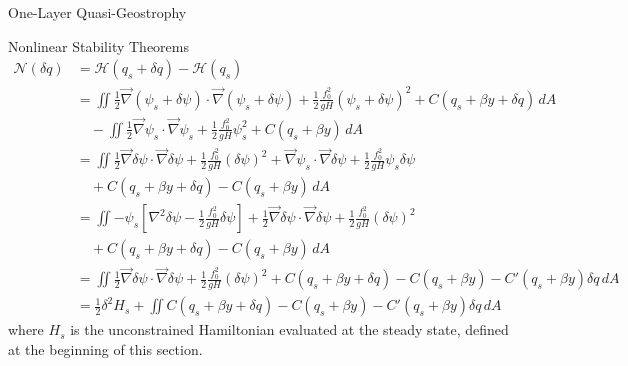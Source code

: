 \documentclass[12pt]{article}
\begin{document}
\begin{section}{One-Layer Quasi-Geostrophy}
\begin{subsection}{Nonlinear Stability Theorems}
        \begin{align*}
            \mathcal{N}(\delta q)
            &= \mathcal{H}(q_s + \delta q) - \mathcal{H}(q_s) \\
            &= \iint  \frac12 \vec\nabla(\psi_s + \delta \psi) \cdot \vec\nabla(\psi_s + \delta \psi) + \frac12 \frac{f_0^2}{g H} (\psi_s + \delta \psi)^2 + C(q_s + \beta y + \delta q) \, dA \\
            &\quad - \iint  \frac12 \vec\nabla\psi_s \cdot \vec\nabla\psi_s + \frac12 \frac{f_0^2}{g H} \psi_s^2 + C(q_s + \beta y) \, dA \\
            &= \iint \frac12 \vec\nabla\delta\psi \cdot \vec\nabla\delta\psi + \frac12 \frac{f_0^2}{g H} (\delta \psi)^2 + \vec\nabla\psi_s \cdot \vec\nabla\delta\psi + \frac12 \frac{f_0^2}{g H} \psi_s\delta\psi \\
            &\quad + C(q_s + \beta y + \delta q) - C(q_s + \beta y) \, dA \\
            &= \iint -\psi_s \left[ \nabla^2\delta\psi - \frac12 \frac{f_0^2}{g H} \delta\psi \right] + \frac12 \vec\nabla\delta\psi \cdot \vec\nabla\delta\psi + \frac12 \frac{f_0^2}{g H}(\delta\psi)^2 \\
            &\quad + C(q_s + \beta y + \delta q) - C(q_s + \beta y) \, dA \\
            &= \iint \frac12 \vec\nabla\delta\psi \cdot \vec\nabla\delta\psi + \frac12 \frac{f_0^2}{g H}(\delta \psi)^2 + C(q_s + \beta y + \delta q) - C(q_s + \beta y) -C'(q_s + \beta y)\delta q\, dA \\
            &= \frac12 \delta^2 H_s + \iint C(q_s + \beta y + \delta q) - C(q_s + \beta y) -C'(q_s + \beta y)\delta q\, dA
        \end{align*}
        where $H_s$ is the unconstrained Hamiltonian evaluated at the steady state, defined at the beginning of this section.
    \end{subsection}
\end{section}
\end{document}
